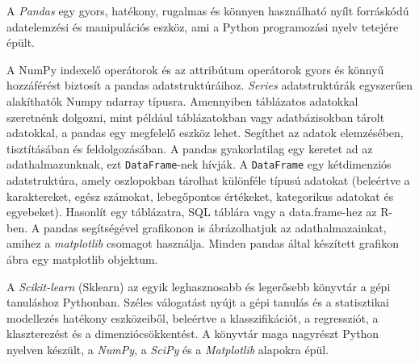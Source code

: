 A \textit{Pandas} egy gyors, hatékony, rugalmas és könnyen használható nyílt forráskódú adatelemzési és manipulációs eszköz, ami a Python programozási nyelv tetejére épült.

A NumPy indexelő operátorok és az attribútum operátorok gyors és könnyű hozzáférést biztosít a pandas adatstruktúráihoz. \textit{Series} adatstruktúrák egyszerűen alakíthatók Numpy ndarray típusra.
Amennyiben táblázatos adatokkal szeretnénk dolgozni, mint például táblázatokban vagy adatbázisokban tárolt adatokkal, a pandas egy megfelelő eszköz lehet. Segíthet az adatok elemzésében, tisztításában és feldolgozásában. A pandas gyakorlatilag egy keretet ad az adathalmazunknak, ezt \texttt{DataFrame}-nek hívják. A \texttt{DataFrame} egy kétdimenziós adatstruktúra, amely oszlopokban tárolhat különféle típusú adatokat (beleértve a karaktereket, egész számokat, lebegőpontos értékeket, kategorikus adatokat és egyebeket). Hasonlít egy táblázatra, SQL táblára vagy a data.frame-hez az R-ben.
A pandas segítségével grafikonon is ábrázolhatjuk az adathalmazainkat, amihez a \textit{matplotlib} csomagot használja. Minden pandas által készített grafikon ábra egy matplotlib objektum.



A \textit{Scikit-learn} (Sklearn) az egyik leghasznosabb és legerősebb könyvtár a gépi tanuláshoz Pythonban. Széles válogatást nyújt a gépi tanulás és a statisztikai modellezés hatékony eszközeiből, beleértve a klasszifikációt, a regressziót, a klaszterezést és a dimenziócsökkentést. A könyvtár maga nagyrészt Python nyelven készült, a \textit{NumPy}, a \textit{SciPy} és a \textit{Matplotlib} alapokra épül.
